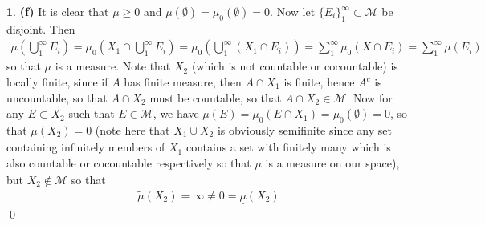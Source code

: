 \documentclass[10.5pt]{article}
\theoremstyle{definition}
\newtheorem{pb}{}
\newcommand{\set}[1]{\{#1\}}
\begin{document}
\begin{pb}
        \textbf{(f)} It is clear that \(\mu \geq 0\) and \(\mu(\emptyset) = \mu_0(\emptyset) = 0\). Now let \(\set{E_i}_1^\infty \subset \mathcal{M}\) be disjoint. Then
        \begin{align*}
            \mu(\bigcup_1^\infty E_i) = \mu_0(X_1 \cap \bigcup_1^\infty E_i) = \mu_0(\bigcup_1^\infty(X_1 \cap E_i)) = \sum_1^\infty \mu_0(X \cap E_i) = \sum_1^\infty \mu(E_i)
        \end{align*}
        so that \(\mu\) is a measure. Note that \(X_2\) (which is not countable or cocountable) is locally finite, since if \(A\) has finite measure, then \(A \cap X_1\) is finite, hence \(A^c\) is uncountable, so that \(A \cap X_2\) must be countable, so that \(A \cap X_2 \in \mathcal{M}\). Now for any \(E \subset X_2\) such that \(E \in \mathcal{M}\), we have \(\mu(E) = \mu_0(E \cap X_1) = \mu_0(\emptyset) = 0\), so that \(\underline{\mu}(X_2) = 0\) (note here that \(X_1\cup X_2\) is obviously semifinite since any set containing infinitely members of \(X_1\) contains a set with finitely many which is also countable or cocountable respectively so that \(\underline{\mu}\) is a measure on our space), but \(X_2 \not \in \mathcal{M}\) so that
        \begin{align*}
            \tilde{\mu}(X_2) = \infty \neq 0 = \underline{\mu}(X_2)
        \end{align*} \qed
    \end{pb}
\end{document}
